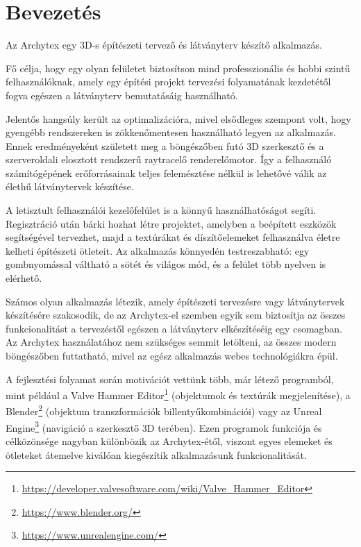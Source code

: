 \part{Bevezetés}

Az Archytex egy 3D-s építészeti tervező és látványterv készítő alkalmazás.

Fő célja, hogy egy olyan felületet biztosítson mind professzionális és hobbi szintű felhasználóknak, amely egy építési projekt tervezési folyamatának kezdetétől fogva egészen a látványterv bemutatásáig használható.

Jelentős hangsúly került az optimalizációra, mivel elsődleges szempont volt, hogy gyengébb rendszereken is zökkenőmentesen használható legyen az alkalmazás. Ennek eredményeként született meg a böngészőben futó 3D szerkesztő és a szerveroldali elosztott rendszerű raytracelő renderelőmotor. Így a felhasználó számítógépének erőforrásainak teljes felemésztése nélkül is lehetővé válik az élethű látványtervek készítése.

A letisztult felhasználói kezelőfelület is a könnyű használhatóságot segíti. Regisztráció után bárki hozhat létre projektet, amelyben a beépített eszközök segítségével tervezhet, majd a textúrákat és díszítőelemeket felhasználva életre kelheti építészeti ötleteit. Az alkalmazás könnyedén testreszabható: egy gombnyomással váltható a sötét és világos mód, és a felület több nyelven is elérhető.

Számos olyan alkalmazás létezik, amely építészeti tervezésre vagy látványtervek készítésére szakosodik, de az Archytex-el szemben egyik sem biztosítja az összes funkcionalitást a tervezéstől egészen a látványterv elkészítéséig egy csomagban. Az Archytex használatához nem szükséges semmit letölteni, az összes modern böngészőben futtatható, mivel az egész alkalmazás webes technológiákra épül.

A fejlesztési folyamat során motivációt vettünk több, már létező programból, mint például a Valve Hammer Editor\footnote{\url{https://developer.valvesoftware.com/wiki/Valve\_Hammer\_Editor}} (objektumok és textúrák megjelenítése), a Blender\footnote{\url{https://www.blender.org/}} (objektum transzformációk billentyűkombinációi) vagy az Unreal Engine\footnote{\url{https://www.unrealengine.com/}} (navigáció a szerkesztő 3D terében). Ezen programok funkciója és célközönsége nagyban különbözik az Archytex-étől, viszont egyes elemeket és ötleteket átemelve kiválóan kiegészítik alkalmazásunk funkcionalitását.